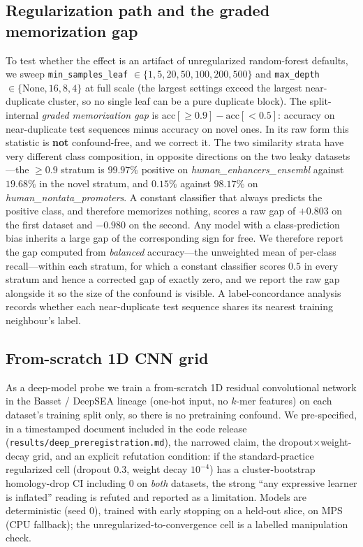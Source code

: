 \documentclass[webpdf,modern,large,namedate]{oup-authoring-template}%
\begin{document}
\subsection{Regularization path and the graded memorization gap}\label{sec:m-graded}
To test whether the effect is an artifact of unregularized random-forest defaults, we sweep \texttt{min\_samples\_leaf} $\in\{1,5,20,50,100,200,500\}$ and \texttt{max\_depth} $\in\{\text{None},16,8,4\}$ at full scale (the largest settings exceed the largest near-duplicate cluster, so no single leaf can be a pure duplicate block). The split-internal \emph{graded memorization gap} is $\mathrm{acc}[\ge0.9]-\mathrm{acc}[<0.5]$: accuracy on near-duplicate test sequences minus accuracy on novel ones. In its raw form this statistic is \textbf{not} confound-free, and we correct it. The two similarity strata have very different class composition, in opposite directions on the two leaky datasets---the $\ge0.9$ stratum is $99.97\%$ positive on \textit{human\_enhancers\_ensembl} against $19.68\%$ in the novel stratum, and $0.15\%$ against $98.17\%$ on \textit{human\_nontata\_promoters}. A constant classifier that always predicts the positive class, and therefore memorizes nothing, scores a raw gap of $+0.803$ on the first dataset and $-0.980$ on the second. Any model with a class-prediction bias inherits a large gap of the corresponding sign for free. We therefore report the gap computed from \emph{balanced} accuracy---the unweighted mean of per-class recall---within each stratum, for which a constant classifier scores $0.5$ in every stratum and hence a corrected gap of exactly zero, and we report the raw gap alongside it so the size of the confound is visible. A label-concordance analysis records whether each near-duplicate test sequence shares its nearest training neighbour's label.

\subsection{From-scratch 1D CNN grid}
As a deep-model probe we train a from-scratch 1D residual convolutional network in the Basset \citep{kelley2016basset} / DeepSEA \citep{zhou2015deepsea} lineage (one-hot input, no $k$-mer features) on each dataset's training split only, so there is no pretraining confound. We pre-specified, in a timestamped document included in the code release (\texttt{results/deep\_preregistration.md}), the narrowed claim, the dropout$\times$weight-decay grid, and an explicit refutation condition: if the standard-practice regularized cell (dropout $0.3$, weight decay $10^{-4}$) has a cluster-bootstrap homology-drop CI including $0$ on \emph{both} datasets, the strong ``any expressive learner is inflated'' reading is refuted and reported as a limitation. Models are deterministic (seed $0$), trained with early stopping on a held-out slice, on MPS (CPU fallback); the unregularized-to-convergence cell is a labelled manipulation check.
\end{document}
